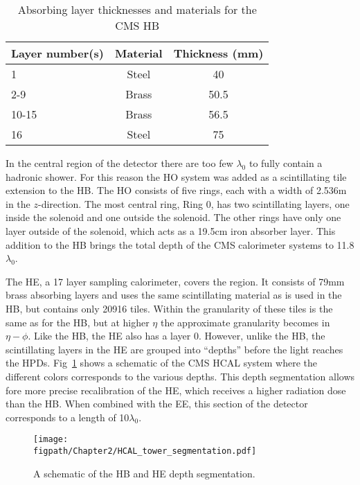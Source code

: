 \begin{table}[htbp]
\caption{Absorbing layer thicknesses and materials for the CMS HB}
\centering
\begin{tabular}{|l|c|c|}%
\hline %
Layer number(s) & Material & Thickness (\unit{mm}) \\%
\hline
1 & Steel & 40 \\%
2-9 & Brass & 50.5 \\%
10-15 & Brass & 56.5 \\%
16 & Steel & 75 \\%
\hline
\end{tabular}
\label{tab:HCAL_brass_thickness}
\end{table}

In the central region of the detector there are too few $\lambda_{0}$ to fully contain a hadronic shower.
For this reason the HO system was added as a scintillating tile extension to the HB.
The HO consists of five rings, each with a width of 2.536\unit{m} in the $z$-direction.
The most central ring, Ring 0, has two scintillating layers, one inside the solenoid and one outside the solenoid.
The other rings have only one layer outside of the solenoid, which acts as a 19.5\unit{cm} iron absorber layer.
This addition to the HB brings the total depth of the CMS calorimeter systems to 11.8$\lambda_{0}$.

The HE, a 17 layer sampling calorimeter, covers the  region.
It consists of 79\unit{mm} brass absorbing layers and uses the same scintillating material as is used in the HB, but contains only 20916 tiles.
Within  the granularity of these tiles is the same as for the HB, but at higher $\eta$ the approximate granularity becomes  in $\eta-\phi$.
Like the HB, the HE also has a layer 0.
However, unlike the HB, the scintillating layers in the HE are grouped into ``depths'' before the light reaches the HPDs.
Fig~\ref{fig:CMS_HCAL_depth} shows a schematic of the CMS HCAL system where the different colors corresponds to the various depths.
This depth segmentation allows fore more precise recalibration of the HE, which receives a higher radiation dose than the HB.
When combined with the EE, this section of the detector corresponds to a length of 10$\lambda_{0}$.

\begin{figure}[!hbt]
	\centering
	\texttt{[image: \\figpath/Chapter2/HCAL\_tower\_segmentation.pdf]}
	\caption{A schematic of the HB and HE depth segmentation.}
	\label{fig:CMS_HCAL_depth}
\end{figure}

